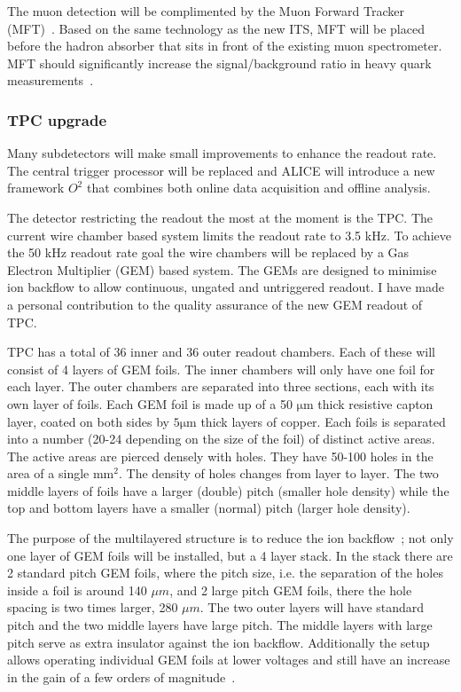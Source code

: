 \setlength{\emergencystretch}{3em}

The muon detection will be complimented by the Muon Forward Tracker (MFT)~\cite{CERN-LHCC-2015-001}. Based on the same technology as the new ITS, MFT will be placed before the hadron absorber that sits in front of the existing muon spectrometer. MFT should significantly increase the signal/background ratio in heavy quark measurements~\cite{CERN-LHCC-2015-001}.

\subsubsection{TPC upgrade}
Many subdetectors will make small improvements to enhance the readout rate. The central trigger processor will be replaced and ALICE will introduce a new framework $O^2$ that combines both online data acquisition and offline analysis.

The detector restricting the readout the most at the moment is the TPC. The current wire chamber based system  limits the readout rate to 3.5 kHz. To achieve the 50 kHz readout rate goal the wire chambers will be replaced by a Gas Electron Multiplier (GEM) based system. The GEMs are designed to minimise ion backflow to allow continuous, ungated and untriggered readout. I have made a personal contribution to the quality assurance of the new GEM readout of TPC.

TPC has a total of 36 inner and 36 outer readout chambers. Each of these will consist of 4 layers of GEM foils. The inner chambers will only have one foil for each layer. The outer chambers are separated into three sections, each with its own layer of foils. Each GEM foil is made up of a 50 $\mathrm{\mu m}$ thick resistive capton layer, coated on both sides by $5 \mathrm{\mu m}$ thick layers of copper. Each foils is separated into a number (20-24 depending on the size of the foil) of distinct active areas. The active areas are pierced densely with holes. They have 50-100 holes in the area of a single $\mathrm{mm^2}$. The density of holes changes from layer to layer. The two middle layers of foils have a larger (double) pitch (smaller hole density) while the top and bottom layers have a smaller (normal) pitch (larger hole density).

The purpose of the multilayered structure is to reduce the ion backflow~\cite{Sauli:2005zx,Ball:2014qaa}; not only one layer of GEM foils will be installed, but a 4 layer stack. In the stack there are 2 standard pitch GEM foils, where the pitch size, i.e. the separation of the holes inside a foil is around 140 $\mu m$, and 2 large pitch GEM foils, there the hole spacing is two times larger, 280 $\mu m$. The two outer layers will have standard pitch and the two middle layers have large pitch. The middle layers with large pitch serve as extra insulator against the ion backflow. Additionally the setup allows operating individual GEM foils at lower voltages and still have an increase in the gain of a few orders of magnitude~\cite{TPCupgrade}.

